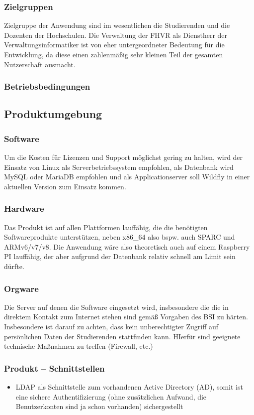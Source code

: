 \documentclass[12pt,a4paper,parskip]{scrreprt}
\begin{document}
\subsubsection{Zielgruppen}
Zielgruppe der Anwendung sind im wesentlichen die Studierenden und die Dozenten der Hochschulen. Die Verwaltung der FHVR als Dienstherr der Verwaltungsinformatiker ist von eher untergeordneter Bedeutung für die Entwicklung, da diese einen zahlenmäßig sehr kleinen Teil der gesamten Nutzerschaft ausmacht.
\subsubsection{Betriebsbedingungen}
\subsection{Produktumgebung}
\subsubsection{Software}
Um die Kosten für Lizenzen und Support möglichst gering zu halten, wird der Einsatz von Linux als Serverbetriebssystem empfohlen, als Datenbank wird MySQL oder MariaDB empfohlen und als Applicationserver soll Wildfly in einer aktuellen Version zum Einsatz kommen.
\subsubsection{Hardware}
Das Produkt ist auf allen Plattformen lauffähig, die die benötigten Softwareprodukte unterstützen, neben x86\_64 also bspw. auch SPARC und ARMv6/v7/v8. Die Anwendung wäre also theoretisch auch auf einem Raspberry PI lauffähig, der aber aufgrund der Datenbank relativ schnell am Limit sein dürfte.
\subsubsection{Orgware}
Die Server auf denen die Software eingesetzt wird, insbesondere die die in direktem Kontakt zum Internet stehen sind gemäß Vorgaben des BSI zu härten. Insbesondere ist darauf zu achten, dass kein unberechtigter Zugriff auf persönlichen Daten der Studierenden stattfinden kann. HIerfür sind geeignete technische Maßnahmen zu treffen (Firewall, etc.)
\subsubsection{Produkt – Schnittstellen}
\begin{itemize}
\item LDAP als Schnittstelle zum vorhandenen Active Directory (AD), somit ist eine sichere Authentifizierung (ohne zusätzlichen Aufwand, die Benutzerkonten sind ja schon vorhanden) sichergestellt
\end{itemize}
\end{document}
